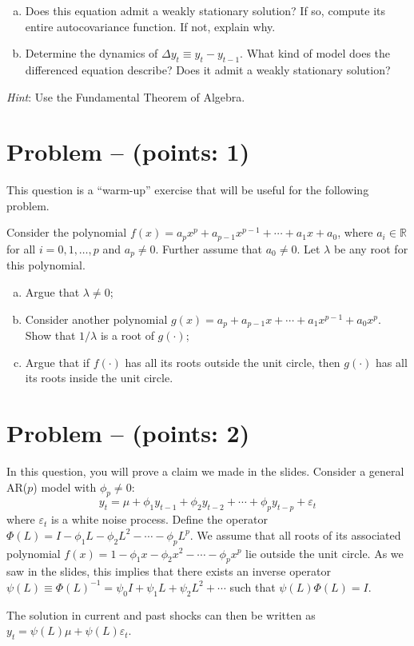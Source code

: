 \documentclass[11pt]{article}
\theoremstyle{definition}
\newcounter{problem}
\renewcommand{\theproblem}{\arabic{problem}}
\newcommand{\problem}[1]{
	\stepcounter{problem}
	\section*{Problem \theproblem{} -- (points: #1)}
}
\begin{document}
\begin{enumerate}[a)]
	\item Does this equation admit a weakly stationary solution? If so, compute its entire autocovariance function. If not, explain why.
	\item Determine the dynamics of $\Delta y_t \equiv y_t - y_{t-1}$. What kind of model does the differenced equation describe? Does it admit a weakly stationary solution?
\end{enumerate}

\textit{Hint}: Use the Fundamental Theorem of Algebra.

\problem{1}
This question is a ``warm-up'' exercise that will be useful for the following problem.

Consider the polynomial $f(x) = a_p x^p + a_{p-1} x^{p-1} + \cdots + a_1 x + a_0$, where $a_i \in \mathbb{R}$ for all $i = 0, 1, \ldots, p$ and $a_p \neq 0$. Further assume that $a_0 \neq 0$. Let $\lambda$ be any root for this polynomial.

\begin{enumerate}[a)]
	\item Argue that $\lambda \neq 0$;
	\item Consider another polynomial $g(x) = a_p + a_{p-1} x + \cdots + a_1 x^{p-1} + a_0 x^p$. Show that $1/\lambda$ is a root of $g(\cdot)$;
	\item Argue that if $f(\cdot)$ has all its roots outside the unit circle, then $g(\cdot)$ has all its roots inside the unit circle.
\end{enumerate}

\newpage
\problem{2}
In this question, you will prove a claim we made in the slides. Consider a general AR($p$) model with $\phi_p \neq 0$:
\begin{equation*}
y_t = \mu + \phi_1 y_{t-1} + \phi_2 y_{t-2} + \cdots + \phi_p y_{t-p} + \varepsilon_t
\end{equation*}
where $\varepsilon_t$ is a white noise process. Define the operator $\Phi(L) = I - \phi_1 L - \phi_2 L^2 - \cdots - \phi_p L^p$. We assume that all roots of its associated polynomial $f(x) = 1 - \phi_1x - \phi_2x^2 - \cdots - \phi_px^p$ lie outside the unit circle. As we saw in the slides, this implies that there exists an inverse operator $\psi(L) \equiv \Phi(L)^{-1} = \psi_0 I + \psi_1 L + \psi_2 L^2 + \cdots$ such that $\psi(L)\Phi(L) = I$.

The solution in current and past shocks can then be written as $y_t = \psi(L)\mu + \psi(L)\varepsilon_t$.
\end{document}
